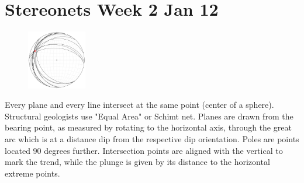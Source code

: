 \documentclass[12pt,a4paper]{report}
\begin{document}
\section*{Stereonets Week 2 Jan 12}
\begin{figure}
  \vspace{-30pt}
  \begin{center}
    \includegraphics[width=0.23\textwidth]{stereonet.jpg}
  \end{center}
  \vspace{-30pt}
\end{figure}
Every plane and every line intersect at the same point (center of a sphere).
Structural geologists use "Equal Area" or Schimt net.
Planes are drawn from the bearing point, as measured by rotating to the horizontal axis, through the great arc which is at a distance dip from
the respective dip orientation. Poles are points located 90 degrees further. Intersection points are aligned with the vertical to mark the trend,
while the plunge is given by its distance to the horizontal extreme points.
\end{document}
